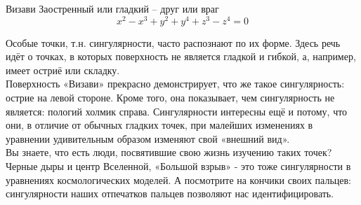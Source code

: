 \begin{surferPage}{Визави}
Заостренный или гладкий – друг или враг\\
\smallskip
\[x^2	- x^3+ y^2+ y^4+ z^3- z^4	=  0\]

\vspace{0.3cm}
Особые точки, т.н. сингулярности, часто распознают по их форме. Здесь речь идёт о точках, в которых поверхность не является гладкой и гибкой, а, например, имеет остриё или складку.\\
\vspace{0.3cm}
Поверхность «Визави» прекрасно демонстрирует, что же такое сингулярность: острие на левой стороне. Кроме того, она показывает, чем сингулярность не является: пологий холмик справа. Сингулярности интересны ещё и потому, что они, в отличие от обычных гладких точек, при малейших изменениях в уравнении удивительным образом изменяют свой «внешний вид». \\

\vspace{0.3cm}
Вы знаете, что есть люди, посвятившие свою жизнь изучению таких точек? Черные дыры и центр Вселенной, «Большой взрыв» - это тоже сингулярности в уравнениях космологических моделей. А посмотрите на кончики своих пальцев: сингулярности наших отпечатков пальцев позволяют нас идентифицировать.
\end{surferPage}
